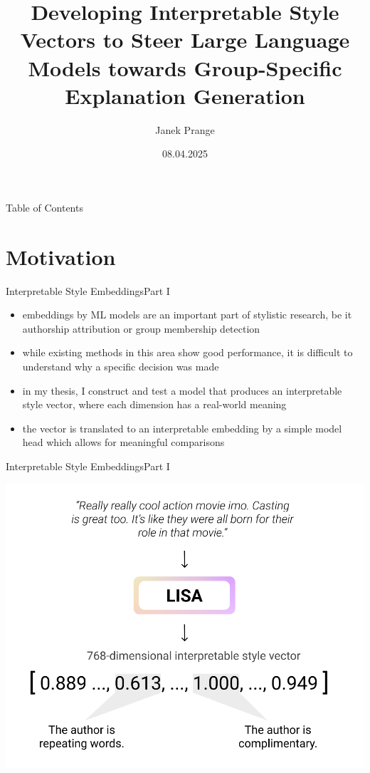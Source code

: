 \documentclass[]{beamer}
\title[Master's Thesis Presentation]{Developing Interpretable Style Vectors to Steer Large Language Models towards Group-Specific Explanation Generation}
\date{08.04.2025}
\author{Janek Prange}
\begin{document}
\begin{frame}
  \titlepage
\end{frame}

\begin{frame}[shrink,t]{Table of Contents}
  \tableofcontents
\end{frame}


\section{Motivation}
\begin{frame}{Interpretable Style Embeddings}{Part I}
  \begin{itemize}
    \item embeddings by ML models are an important part of stylistic research, be it authorship attribution or group membership detection
    \item while existing methods in this area show good performance, it is difficult to understand why a specific decision was made
          \pause
    \item in my thesis, I construct and test a model that produces an interpretable style vector, where each dimension has a real-world meaning
    \item the vector is translated to an interpretable embedding by a simple model head which allows for meaningful comparisons
  \end{itemize}
\end{frame}

\begin{frame}{Interpretable Style Embeddings}{Part I}
  \begin{center}
    \includegraphics[width=0.8\linewidth]{img/interpretable_style_vector.png}
  \end{center}
\end{frame}
\end{document}
